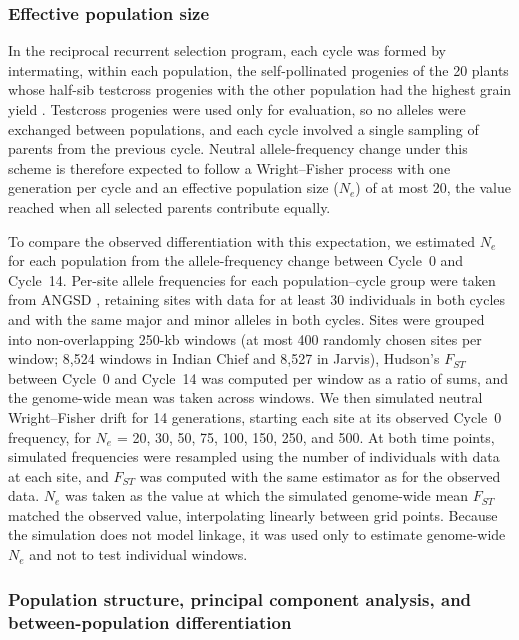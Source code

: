 \subsubsection{Effective population size}

In the reciprocal recurrent selection program, each cycle was formed by intermating, within each population, the self-pollinated progenies of the 20 plants whose half-sib testcross progenies with the other population had the highest grain yield \citep{MollStuber1971}. Testcross progenies were used only for evaluation, so no alleles were exchanged between populations, and each cycle involved a single sampling of parents from the previous cycle. Neutral allele-frequency change under this scheme is therefore expected to follow a Wright--Fisher process with one generation per cycle and an effective population size ($N_e$) of at most 20, the value reached when all selected parents contribute equally.

To compare the observed differentiation with this expectation, we estimated $N_e$ for each population from the allele-frequency change between Cycle~0 and Cycle~14. Per-site allele frequencies for each population--cycle group were taken from ANGSD \citep{Korneliussen2014ANGSD}, retaining sites with data for at least 30 individuals in both cycles and with the same major and minor alleles in both cycles. Sites were grouped into non-overlapping 250-kb windows (at most 400 randomly chosen sites per window; 8,524 windows in Indian Chief and 8,527 in Jarvis), Hudson's $F_{ST}$ \citep{Bhatia2013Fst} between Cycle~0 and Cycle~14 was computed per window as a ratio of sums, and the genome-wide mean was taken across windows. We then simulated neutral Wright--Fisher drift for 14 generations, starting each site at its observed Cycle~0 frequency, for $N_e$ = 20, 30, 50, 75, 100, 150, 250, and 500. At both time points, simulated frequencies were resampled using the number of individuals with data at each site, and $F_{ST}$ was computed with the same estimator as for the observed data. $N_e$ was taken as the value at which the simulated genome-wide mean $F_{ST}$ matched the observed value, interpolating linearly between grid points. Because the simulation does not model linkage, it was used only to estimate genome-wide $N_e$ and not to test individual windows.

\subsubsection{Population structure, principal component analysis, and between-population differentiation}

